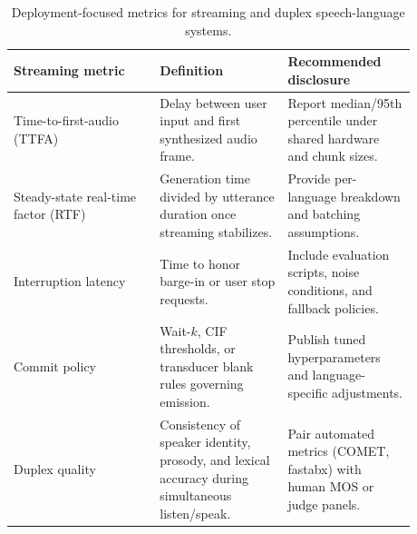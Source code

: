 \begin{table}[ht]
    \centering
    \small
    \renewcommand{\arraystretch}{1.15}
    \begin{tabular}{p{0.32\linewidth} p{0.28\linewidth} p{0.28\linewidth}}
        \toprule
        \textbf{Streaming metric} & \textbf{Definition} & \textbf{Recommended disclosure} \\
        \midrule
        Time-to-first-audio (TTFA) & Delay between user input and first synthesized audio frame. & Report median/95th percentile under shared hardware and chunk sizes. \\
        Steady-state real-time factor (RTF) & Generation time divided by utterance duration once streaming stabilizes. & Provide per-language breakdown and batching assumptions. \\
        Interruption latency & Time to honor barge-in or user stop requests. & Include evaluation scripts, noise conditions, and fallback policies. \\
        Commit policy & Wait-$k$, CIF thresholds, or transducer blank rules governing emission. & Publish tuned hyperparameters and language-specific adjustments. \\
        Duplex quality & Consistency of speaker identity, prosody, and lexical accuracy during simultaneous listen/speak. & Pair automated metrics (COMET, fastabx) with human MOS or judge panels. \\
        \bottomrule
    \end{tabular}
    \caption{Deployment-focused metrics for streaming and duplex speech-language systems.}
    \label{tab:streaming_metrics}
\end{table}
